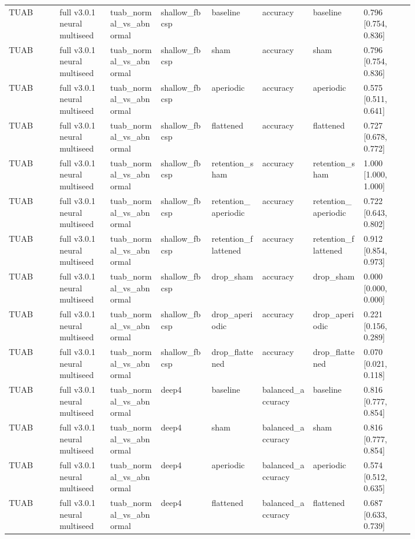 \begin{longtable}{p{0.10\linewidth}p{0.10\linewidth}p{0.10\linewidth}p{0.10\linewidth}p{0.10\linewidth}p{0.10\linewidth}p{0.10\linewidth}p{0.10\linewidth}}
TUAB & full v3.0.1 neural multiseed & tuab\_normal\_vs\_abnormal & shallow\_fbcsp & baseline & accuracy & baseline & 0.796 [0.754, 0.836]\\
TUAB & full v3.0.1 neural multiseed & tuab\_normal\_vs\_abnormal & shallow\_fbcsp & sham & accuracy & sham & 0.796 [0.754, 0.836]\\
TUAB & full v3.0.1 neural multiseed & tuab\_normal\_vs\_abnormal & shallow\_fbcsp & aperiodic & accuracy & aperiodic & 0.575 [0.511, 0.641]\\
TUAB & full v3.0.1 neural multiseed & tuab\_normal\_vs\_abnormal & shallow\_fbcsp & flattened & accuracy & flattened & 0.727 [0.678, 0.772]\\
TUAB & full v3.0.1 neural multiseed & tuab\_normal\_vs\_abnormal & shallow\_fbcsp & retention\_sham & accuracy & retention\_sham & 1.000 [1.000, 1.000]\\
TUAB & full v3.0.1 neural multiseed & tuab\_normal\_vs\_abnormal & shallow\_fbcsp & retention\_aperiodic & accuracy & retention\_aperiodic & 0.722 [0.643, 0.802]\\
TUAB & full v3.0.1 neural multiseed & tuab\_normal\_vs\_abnormal & shallow\_fbcsp & retention\_flattened & accuracy & retention\_flattened & 0.912 [0.854, 0.973]\\
TUAB & full v3.0.1 neural multiseed & tuab\_normal\_vs\_abnormal & shallow\_fbcsp & drop\_sham & accuracy & drop\_sham & 0.000 [0.000, 0.000]\\
TUAB & full v3.0.1 neural multiseed & tuab\_normal\_vs\_abnormal & shallow\_fbcsp & drop\_aperiodic & accuracy & drop\_aperiodic & 0.221 [0.156, 0.289]\\
TUAB & full v3.0.1 neural multiseed & tuab\_normal\_vs\_abnormal & shallow\_fbcsp & drop\_flattened & accuracy & drop\_flattened & 0.070 [0.021, 0.118]\\
TUAB & full v3.0.1 neural multiseed & tuab\_normal\_vs\_abnormal & deep4 & baseline & balanced\_accuracy & baseline & 0.816 [0.777, 0.854]\\
TUAB & full v3.0.1 neural multiseed & tuab\_normal\_vs\_abnormal & deep4 & sham & balanced\_accuracy & sham & 0.816 [0.777, 0.854]\\
TUAB & full v3.0.1 neural multiseed & tuab\_normal\_vs\_abnormal & deep4 & aperiodic & balanced\_accuracy & aperiodic & 0.574 [0.512, 0.635]\\
TUAB & full v3.0.1 neural multiseed & tuab\_normal\_vs\_abnormal & deep4 & flattened & balanced\_accuracy & flattened & 0.687 [0.633, 0.739]\\

\end{longtable}

